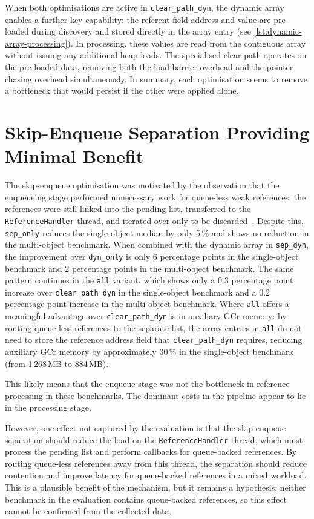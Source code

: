 When both optimisations are active in \texttt{clear\_path\_dyn}, the dynamic array enables a further key capability: the referent field address and value are pre-loaded during discovery and stored directly in the array entry (see \cref{lst:dynamic-array-processing}). In processing, these values are read from the contiguous array without issuing any additional heap loads. The specialised clear path operates on the pre-loaded data, removing both the load-barrier overhead and the pointer-chasing overhead simultaneously. In summary, each optimisation seems to remove a bottleneck that would persist if the other were applied alone.

\section{Skip-Enqueue Separation Providing Minimal Benefit}
\label{sec:disc-sep}

The skip-enqueue optimisation was motivated by the observation that the enqueueing stage performed unnecessary work for queue-less weak references: the references were still linked into the pending list, transferred to the \texttt{ReferenceHandler} thread, and iterated over only to be discarded~\cite{openjdk-reference-java,openjdk-zreferenceprocessor-cpp,JDK-8029205}. Despite this, \texttt{sep\_only} reduces the single-object median by only 5\,\% and shows no reduction in the multi-object benchmark. When combined with the dynamic array in \texttt{sep\_dyn}, the improvement over \texttt{dyn\_only} is only 6 percentage points in the single-object benchmark and 2 percentage points in the multi-object benchmark. The same pattern continues in the \texttt{all} variant, which shows only a 0.3 percentage point increase over \texttt{clear\_path\_dyn} in the single-object benchmark and a 0.2 percentage point increase in the multi-object benchmark. Where \texttt{all} offers a meaningful advantage over \texttt{clear\_path\_dyn} is in auxiliary \ac{GCr} memory: by routing queue-less references to the separate list, the array entries in \texttt{all} do not need to store the reference address field that \texttt{clear\_path\_dyn} requires, reducing auxiliary \ac{GCr} memory by approximately 30\,\% in the single-object benchmark (from 1\,268\,MB to 884\,MB).

This likely means that the enqueue stage was not the bottleneck in reference processing in these benchmarks. The dominant costs in the pipeline appear to lie in the processing stage.

However, one effect not captured by the evaluation is that the skip-enqueue separation should reduce the load on the \texttt{ReferenceHandler} thread, which must process the pending list and perform callbacks for queue-backed references. By routing queue-less references away from this thread, the separation should reduce contention and improve latency for queue-backed references in a mixed workload. This is a plausible benefit of the mechanism, but it remains a hypothesis: neither benchmark in the evaluation contains queue-backed references, so this effect cannot be confirmed from the collected data.

